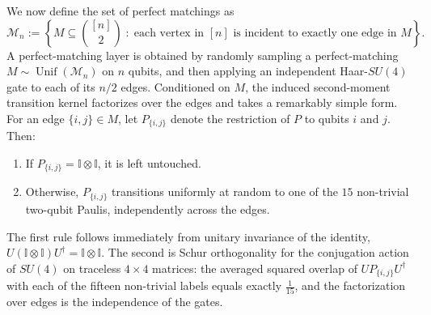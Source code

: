 \documentclass[
    aps,
    superscriptaddress,
    onecolumn,
    10pt,
    prx,
    nofootinbib
]{revtex4-2}
\theoremstyle{namedstatement}
\theoremstyle{plain}
\begin{document}
We now define the set of perfect matchings as
\begin{equation}
    \mathcal{M}_n
    :=
    \left\{
        M \subseteq \binom{[n]}{2}
        \;:\;
        \text{each vertex in $[n]$ is incident to exactly one edge in $M$}
    \right\}.
\end{equation}
A perfect-matching layer is obtained by randomly sampling a perfect-matching $M \sim \operatorname{Unif}(\mathcal{M}_n)$ on $n$ qubits, and then applying an independent Haar-$SU(4)$ gate to each of its $n/2$ edges. Conditioned on $M$, the induced second-moment transition kernel factorizes over the edges and takes a remarkably simple form. For an edge $\{i,j\} \in M$, let $P_{\{i,j\}}$ denote the restriction of $P$ to qubits $i$ and $j$. Then:
\begin{enumerate}
    \item If $P_{\{i,j\}} =\mathbb{I}\otimes\mathbb{I}$, it is left untouched.
    \item Otherwise, $P_{\{i,j\}}$ transitions uniformly at random to one of the $15$ non-trivial two-qubit Paulis, independently across the edges.
\end{enumerate}
The first rule follows immediately from unitary invariance of the identity,
$U(\mathbb{I}\otimes\mathbb{I})U^\dagger = \mathbb{I}\otimes\mathbb{I}$.
The second is Schur orthogonality for the conjugation action of
$SU(4)$ on traceless $4\times4$ matrices: the
averaged squared overlap of $U P_{\{i,j\}} U^{\dagger}$ with each of
the fifteen non-trivial labels equals exactly $\tfrac{1}{15}$, and the
factorization over edges is the independence of the gates.
\end{document}

